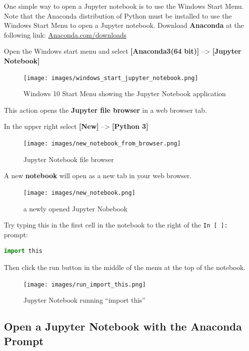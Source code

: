 \documentclass{book}
\begin{document}
    
        One simple way to open a Jupyter notebook is to use the Windows Start
Menu. Note that the Anaconda distribution of Python must be installed to
use the Windows Start Menu to open a Jupyter notebook. Download
\textbf{Anaconda} at the following link:
\href{https://www.anaconda.com/download/}{Anaconda.com/downloads}

Open the Windows start menu and select \textbf{{[}Anaconda3(64 bit){]}}
--\textgreater{} \textbf{{[}Jupyter Notebook{]}}

\begin{figure}
\centering
\texttt{[image: images/windows\_start\_jupyter\_notebook.png]}
\caption{Windows 10 Start Menu showing the Jupyter Notebook application}
\end{figure}

This action opens the \textbf{Jupyter file browser} in a web browser
tab.

In the upper right select \textbf{{[}New{]}} --\textgreater{}
\textbf{{[}Python 3{]}}

\begin{figure}
\centering
\texttt{[image: images/new\_notebook\_from\_browser.png]}
\caption{Jupyter Notebook file browser}
\end{figure}

A new \textbf{notebook} will open as a new tab in your web browser.

\begin{figure}
\centering
\texttt{[image: images/new\_notebook.png]}
\caption{a newly opened Jupyter Nobebook}
\end{figure}

Try typing this in the first cell in the notebook to the right of the
\lstinline!In [ ]:! prompt:

\begin{lstlisting}[language=Python]
import this
\end{lstlisting}

Then click the run button in the middle of the menu at the top of the
notebook.

\begin{figure}
\centering
\texttt{[image: images/run\_import\_this.png]}
\caption{Jupyter Notebook running ``import this''}
\end{figure}
    




    
        \subsection{Open a Jupyter Notebook with the Anaconda
Prompt}\label{open-a-jupyter-notebook-with-the-anaconda-prompt}
    
\end{document}

